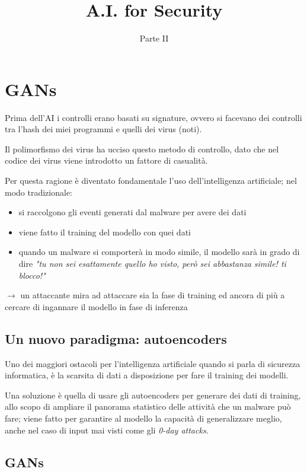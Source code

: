 \documentclass{report}
\title{\huge\textbf{{A.I. for Security}}}
\date{Parte II}
\begin{document}
\maketitle
\tableofcontents
\newpage

\chapter{GANs}

Prima dell'AI i controlli erano basati su signature, ovvero si facevano dei controlli tra l'hash dei miei programmi e quelli dei virus (noti).

\noindent Il polimorfismo dei virus ha ucciso questo metodo di controllo, dato che nel codice dei virus viene introdotto un fattore di casualità.

\noindent Per questa ragione è diventato fondamentale l'uso dell'intelligenza artificiale; nel modo tradizionale:
\begin{itemize}
    \item si raccolgono gli eventi generati dal malware per avere dei dati 
    \item viene fatto il training del modello con quei dati 
    \item quando un malware si comporterà in modo simile, il modello sarà in grado di dire \textit{"tu non sei esattamente quello ho visto, però sei 
    abbastanza simile! ti blocco!"}
\end{itemize}

\noindent $\rightarrow$ un attaccante mira ad attaccare sia la fase di training ed ancora di più a cercare di ingannare il modello in fase di inferenza

\section{Un nuovo paradigma: autoencoders}

Uno dei maggiori ostacoli per l'intelligenza artificiale quando si parla di sicurezza informatica, è la scarsita di dati a disposizione per fare 
il training dei modelli.

\noindent Una soluzione è quella di usare gli autoencoders per generare dei dati di training, allo scopo di ampliare il panorama statistico delle attività che un malware 
può fare; viene fatto per garantire al modello la capacità di generalizzare meglio, anche nel caso di input mai visti come gli \textit{0-day attacks}.

\newpage
\section{GANs}
\end{document}
